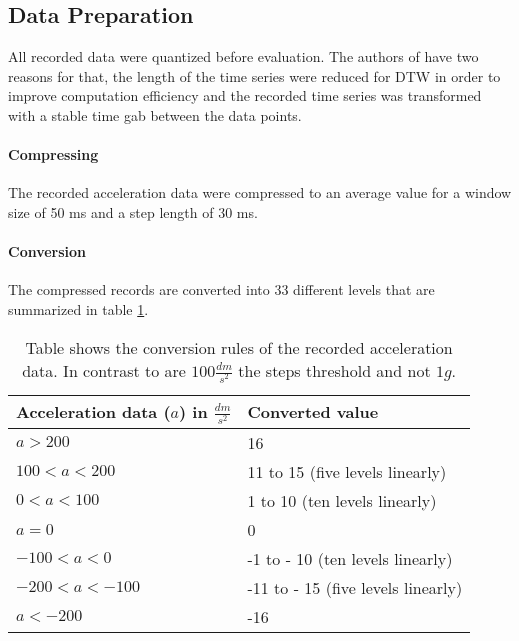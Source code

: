\subsection{Data Preparation} \label{data_preparation}

All recorded data were quantized before evaluation. The authors of \cite{liu2009uwave} have two reasons for that,
the length of the time series were reduced for DTW in order to improve computation efficiency and the recorded time
series was transformed with a stable time gab between the data points.

\paragraph{Compressing} The recorded acceleration data were compressed to an average value for a window size of 50
ms and a step length of 30 ms.

\paragraph{Conversion} The compressed records are converted into 33 different levels that are summarized in
table \ref{table:conversion}.

\begin{table}
    \begin{center}
        \begin{tabularx}{\textwidth}{XX}
            \hline
            \textbf{Acceleration data ($a$) in $\frac{dm}{s^2}$} & \textbf{Converted value}\\
            \hline
            $a > 200$ & 16\\
            $100 < a < 200$ & 11 to 15 (five levels linearly)\\
            $0 < a < 100$ & 1 to 10 (ten levels linearly)\\
            $a = 0$ & 0\\
            $-100 < a < 0$ & -1 to - 10 (ten levels linearly)\\
            $-200 < a < -100$ & -11 to - 15 (five levels linearly)\\
            $a < -200$ & -16\\
            \hline
        \end{tabularx}
    \end{center}
    \caption{Table shows the conversion rules of the recorded acceleration data. In contrast to \cite{liu2009uwave} are
    $100\frac{dm}{s^2}$ the steps threshold and not $1g$.}
	\label{table:conversion}
\end{table}
